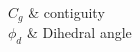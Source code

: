 \documentclass[11pt, a4paper, twoside]{Thesis} %
\begin{document}
%
%
%
%




%




\clearpage %


{
$C_g$ & contiguity \\
$\phi_d$ & Dihedral angle
}
\end{document}
